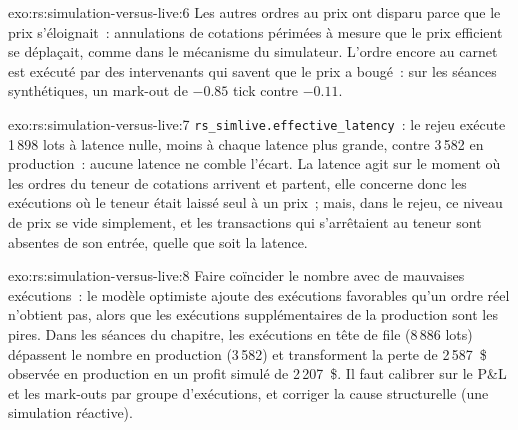 \begin{solution}{exo:rs:simulation-versus-live:6}
Les autres ordres au prix ont disparu parce que le prix s'éloignait~: annulations de cotations périmées à mesure que le prix efficient se déplaçait, comme dans le mécanisme du simulateur. L'ordre encore
au carnet est exécuté par des intervenants qui savent que le prix a bougé~: sur les séances synthétiques, un mark-out de $-0.85$ tick contre $-0.11$.
\end{solution}

\begin{solution}{exo:rs:simulation-versus-live:7}
\texttt{rs\_simlive.effective\_latency}~: le rejeu exécute 1\,898 lots à latence nulle, moins à chaque latence plus grande, contre 3\,582 en production~: aucune latence ne comble l'écart.
La latence agit sur le moment où les ordres du teneur de cotations arrivent et partent, elle concerne donc les exécutions où le teneur était laissé seul à un prix~; mais, dans le rejeu, ce niveau de prix se vide simplement,
et les transactions qui s'arrêtaient au teneur sont absentes de son entrée, quelle que soit la latence.
\end{solution}

\begin{solution}{exo:rs:simulation-versus-live:8}
Faire coïncider le nombre avec de mauvaises exécutions~: le modèle optimiste ajoute des exécutions favorables qu'un ordre réel n'obtient pas, alors que les exécutions supplémentaires de la production sont les pires. Dans les séances du chapitre,
les exécutions en tête de file (8\,886 lots) dépassent le nombre en production (3\,582) et transforment la perte de 2\,587~\$ observée en production en un profit simulé de 2\,207~\$.
Il faut calibrer sur le P\&L et les mark-outs par groupe d'exécutions, et corriger la cause structurelle (une simulation réactive).
\end{solution}

